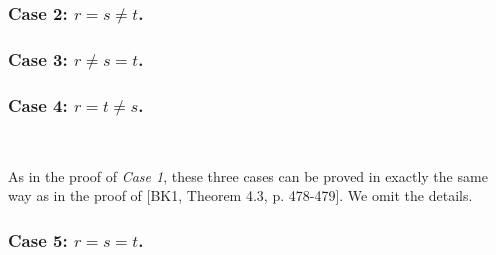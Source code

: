\documentclass[11pt, reqno]{amsart} \textwidth=14.9cm \oddsidemargin=1cm \evensidemargin=1cm
\theoremstyle{definition}
\numberwithin{equation}{section}
\begin{document}
\subsubsection*{Case 2: $r=s\neq t$.}
\subsubsection*{Case 3: $r\neq s=t$.}
\subsubsection*{Case 4: $r= t\neq s$.}

\

\vspace{0.3cm}\noindent As in the proof of \emph{Case 1}, these three cases can be proved in exactly the same way as in the proof of [BK1, Theorem 4.3, p. 478-479]. We omit the details.

\subsubsection*{Case 5: $r=s=t$.}

\
\end{document}
